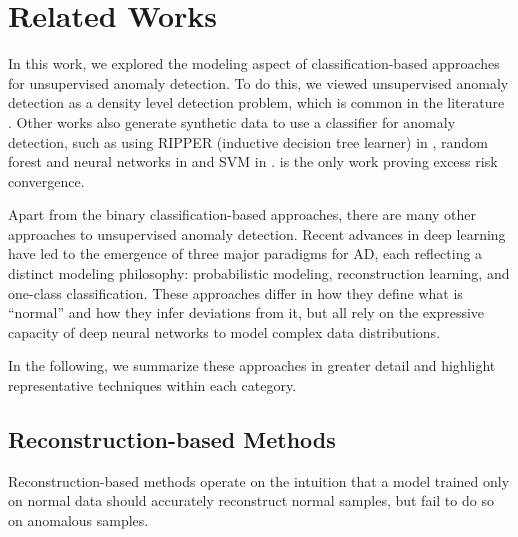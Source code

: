 \documentclass{article}
\begin{document}




\section{Related Works}\label{section:related}

In this work, we explored the modeling aspect of classification-based approaches for unsupervised anomaly detection.
To do this, we viewed unsupervised anomaly detection as a density level detection problem, which is common in the literature \citep{min_vol_svm_davenport, dbscan, min_vol_set_scott_jmlr}.
Other works also generate synthetic data to use a classifier for anomaly detection, such as using RIPPER (inductive decision tree learner) in \citet{kdd_artificial_anom_wenke}, random forest and neural networks in \citet{sipple20NSNN} and SVM in \citet{steinwart2005classification}.
\citet{steinwart2005classification} is the only work proving excess risk convergence.

Apart from the binary classification-based approaches, there are many other approaches to unsupervised anomaly detection.
Recent advances in deep learning have led to the emergence of three major paradigms for AD, each reflecting a distinct modeling philosophy: probabilistic modeling, reconstruction learning, and one-class classification. 
These approaches differ in how they define what is “normal” and how they infer deviations from it, but all rely on the expressive capacity of deep neural networks to model complex data distributions.

In the following, we summarize these approaches in greater detail and highlight  representative techniques within each category.

\subsection{Reconstruction-based Methods}
Reconstruction-based methods operate on the intuition that a model trained only on normal data should accurately reconstruct normal samples, but fail to do so on anomalous samples.
\end{document}
